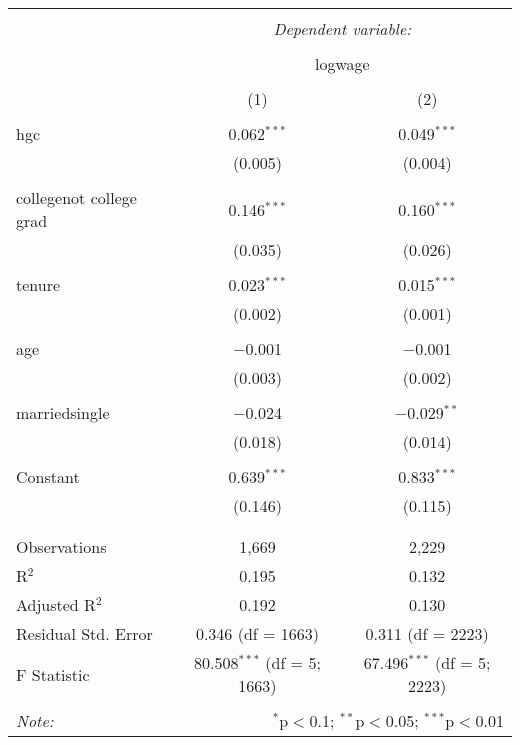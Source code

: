 \documentclass{article}
\begin{document}
\begin{table}[!htbp] \centering 
  \caption{} 
  \label{} 
\begin{tabular}{@{\extracolsep{5pt}}lcc} 
\\[-1.8ex]\hline 
\hline \\[-1.8ex] 
 & \multicolumn{2}{c}{\textit{Dependent variable:}} \\ 
\cline{2-3} 
\\[-1.8ex] & \multicolumn{2}{c}{logwage} \\ 
\\[-1.8ex] & (1) & (2)\\ 
\hline \\[-1.8ex] 
 hgc & 0.062$^{***}$ & 0.049$^{***}$ \\ 
  & (0.005) & (0.004) \\ 
  & & \\ 
 collegenot college grad & 0.146$^{***}$ & 0.160$^{***}$ \\ 
  & (0.035) & (0.026) \\ 
  & & \\ 
 tenure & 0.023$^{***}$ & 0.015$^{***}$ \\ 
  & (0.002) & (0.001) \\ 
  & & \\ 
 age & $-$0.001 & $-$0.001 \\ 
  & (0.003) & (0.002) \\ 
  & & \\ 
 marriedsingle & $-$0.024 & $-$0.029$^{**}$ \\ 
  & (0.018) & (0.014) \\ 
  & & \\ 
 Constant & 0.639$^{***}$ & 0.833$^{***}$ \\ 
  & (0.146) & (0.115) \\ 
  & & \\ 
\hline \\[-1.8ex] 
Observations & 1,669 & 2,229 \\ 
R$^{2}$ & 0.195 & 0.132 \\ 
Adjusted R$^{2}$ & 0.192 & 0.130 \\ 
Residual Std. Error & 0.346 (df = 1663) & 0.311 (df = 2223) \\ 
F Statistic & 80.508$^{***}$ (df = 5; 1663) & 67.496$^{***}$ (df = 5; 2223) \\ 
\hline 
\hline \\[-1.8ex] 
\textit{Note:}  & \multicolumn{2}{r}{$^{*}$p$<$0.1; $^{**}$p$<$0.05; $^{***}$p$<$0.01} \\ 
\end{tabular} 
\end{table} 
\newpage
\end{document}
